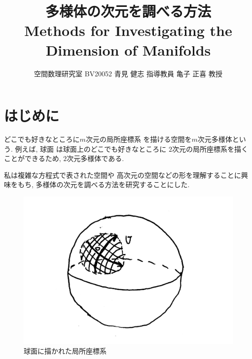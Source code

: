 \documentclass[twocolumn]{jarticle}
\title{
  \LARGE\bf
  多様体の次元を調べる方法 \\[1ex]
  \Large\bf
  Methods for Investigating the Dimension of Manifolds}
\author{空間数理研究室 \quad
        BV20052 青見 健志 \quad
        指導教員 亀子 正喜 教授}
\date{}
\theoremstyle{definition}
\begin{document}
\maketitle
\thispagestyle{empty}

\section{はじめに}
どこでも好きなところに$m$次元の局所座標系
を描ける空間を$m$次元多様体という. 例えば, 球面
は球面上のどこでも好きなところに
$2$次元の局所座標系を描くことができるため, 
$2$次元多様体である.  

私は複雑な方程式で表された空間や
高次元の空間などの形を理解することに興味をもち, 
多様体の次元を調べる方法を研究することにした. 
\begin{figure}[H]
    \centering
    \includegraphics[keepaspectratio, scale=0.15]
         {CoSysInS2.pdf}
    \caption{球面に描かれた局所座標系}
    \label{CoSysInS2}
   \end{figure}
\end{document}
